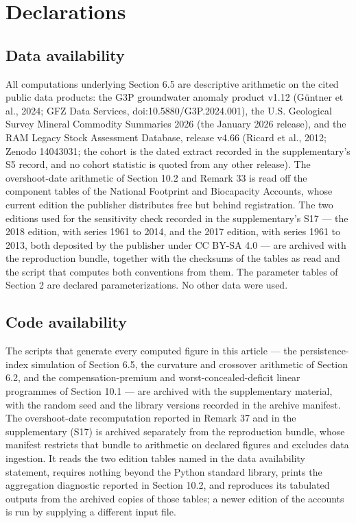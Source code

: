 \documentclass[11pt]{article}
\begin{document}
\section*{Declarations}

\subsection*{Data availability}

All computations underlying Section 6.5 are descriptive arithmetic on
the cited public data products: the G3P groundwater anomaly product
v1.12 (G\"untner et al., 2024; GFZ Data Services,
doi:10.5880/G3P.2024.001), the U.S. Geological Survey Mineral Commodity
Summaries 2026 (the January 2026 release), and the RAM Legacy Stock Assessment Database, release v4.66 (Ricard et al., 2012; Zenodo 14043031; the cohort is the
dated extract recorded in the supplementary's S5 record, and no cohort statistic is quoted from any other release). The overshoot-date arithmetic of Section 10.2 and Remark 33 is read off the component tables of the National Footprint and Biocapacity Accounts, whose current edition the publisher distributes free but behind registration. The two editions used for the sensitivity check recorded in the supplementary's S17 --- the 2018 edition, with series 1961 to 2014, and the 2017 edition, with series 1961 to 2013, both deposited by the publisher under CC BY-SA 4.0 --- are archived with the reproduction bundle, together with the checksums of the tables as read and the script that computes both conventions from them. The parameter tables of Section 2 are declared parameterizations. No other data were used.

\subsection*{Code availability}
The scripts that generate every computed figure in this article --- the persistence-index simulation of Section 6.5, the curvature and crossover arithmetic of Section 6.2, and the compensation-premium and worst-concealed-deficit linear programmes of Section 10.1 --- are archived with the supplementary material, with the random seed and the library versions recorded in the archive manifest. The overshoot-date recomputation reported in Remark 37 and in the supplementary (S17) is archived separately from the reproduction bundle, whose manifest restricts that bundle to arithmetic on declared figures and excludes data ingestion. It reads the two edition tables named in the data availability statement, requires nothing beyond the Python standard library, prints the aggregation diagnostic reported in Section 10.2, and reproduces its tabulated outputs from the archived copies of those tables; a newer edition of the accounts is run by supplying a different input file.
\end{document}
